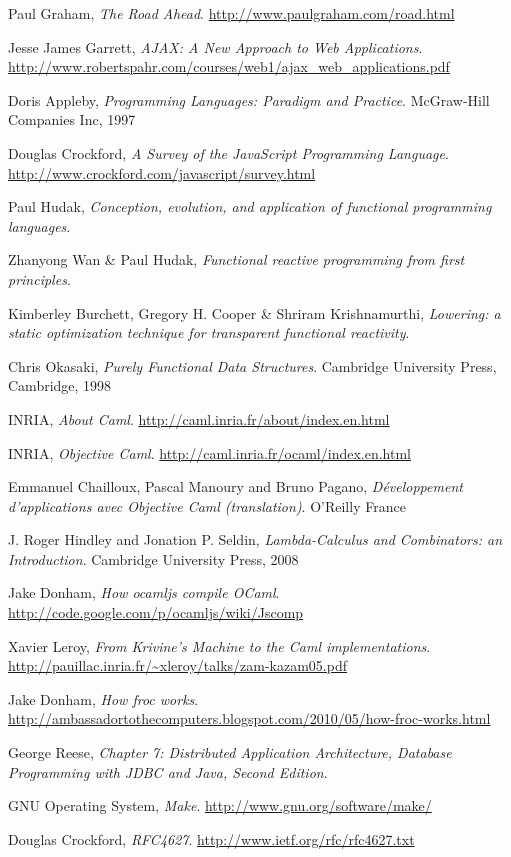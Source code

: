 \clearpage
{}
\begin{thebibliography}{99}

Paul Graham,
\emph{The Road Ahead}.
\url{http://www.paulgraham.com/road.html}

Jesse James Garrett,
\emph{AJAX: A New Approach to Web Applications}.
\url{http://www.robertspahr.com/courses/web1/ajax_web_applications.pdf}

Doris Appleby,
\emph{Programming Languages: Paradigm and Practice}.
McGraw-Hill Companies Inc,
1997

Douglas Crockford,
\emph{A Survey of the JavaScript Programming Language}.
\url{http://www.crockford.com/javascript/survey.html}

Paul Hudak,
\emph{Conception, evolution, and application of functional programming languages}.

Zhanyong Wan \& Paul Hudak,
\emph{Functional reactive programming from first principles}.

Kimberley Burchett, Gregory H. Cooper \& Shriram Krishnamurthi,
\emph{Lowering: a static optimization technique for transparent functional reactivity}.

Chris Okasaki,
\emph{Purely Functional Data Structures}.
Cambridge University Press, Cambridge,
1998

INRIA,
\emph{About Caml}.
\url{http://caml.inria.fr/about/index.en.html}

INRIA,
\emph{Objective Caml}.
\url{http://caml.inria.fr/ocaml/index.en.html}

Emmanuel Chailloux, Pascal Manoury and Bruno Pagano,
\emph{Développement d'applications avec Objective Caml (translation)}.
O'Reilly France

J. Roger Hindley and Jonation P. Seldin,
\emph{Lambda-Calculus and Combinators: an Introduction}.
Cambridge University Press,
2008

Jake Donham,
\emph{How ocamljs compile OCaml}.
\url{http://code.google.com/p/ocamljs/wiki/Jscomp}

Xavier Leroy,
\emph{From Krivine's Machine to the Caml implementations}.
\url{http://pauillac.inria.fr/~xleroy/talks/zam-kazam05.pdf}

Jake Donham,
\emph{How froc works}.
\url{http://ambassadortothecomputers.blogspot.com/2010/05/how-froc-works.html}

George Reese,
\emph{Chapter 7: Distributed Application Architecture, Database Programming with JDBC and Java, Second Edition}.

GNU Operating System,
\emph{Make}.
\url{http://www.gnu.org/software/make/}

Douglas Crockford,
\emph{RFC4627}.
\url{http://www.ietf.org/rfc/rfc4627.txt}


\end{thebibliography}
